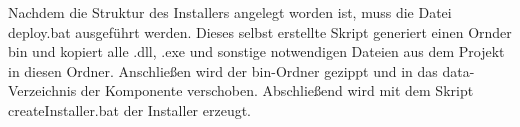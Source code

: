 Nachdem die Struktur des Installers angelegt worden ist, muss die Datei deploy.bat ausgeführt werden. Dieses selbst erstellte Skript generiert einen Ornder bin und kopiert alle .dll, .exe und sonstige notwendigen Dateien aus dem Projekt in diesen Ordner. Anschließen wird der bin-Ordner gezippt und in das data-Verzeichnis der Komponente verschoben. Abschließend wird mit dem Skript createInstaller.bat der Installer erzeugt. 
\newpage
